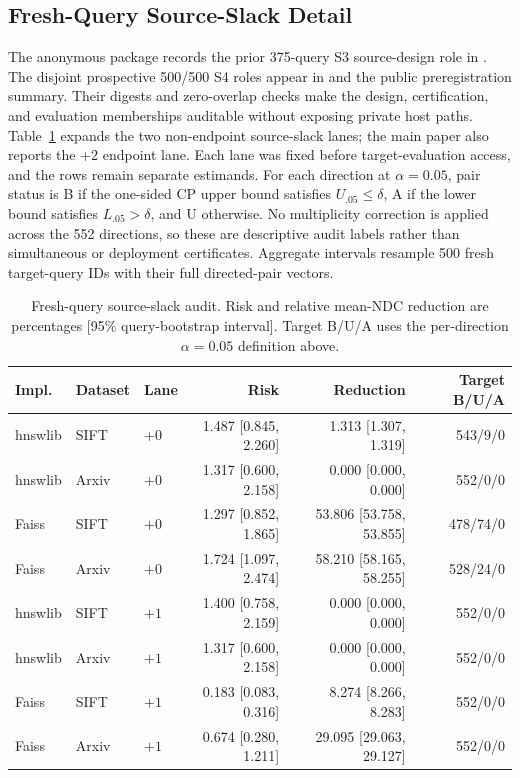 \documentclass[sigconf,anonymous]{acmart}
\begin{document}
\subsection{Fresh-Query Source-Slack Detail}
The anonymous package records the prior 375-query S3 source-design role in . The disjoint prospective 500/500 S4 roles appear in  and the public preregistration summary. Their digests and zero-overlap checks make the design, certification, and evaluation memberships auditable without exposing private host paths.
Table~\ref{tab:fresh-detail} expands the two non-endpoint source-slack lanes; the main paper also reports the $+2$ endpoint lane. Each lane was fixed before target-evaluation access, and the rows remain separate estimands. For each direction at $\alpha=0.05$, pair status is B if the one-sided CP upper bound satisfies $U_{.05}\leq\delta$, A if the lower bound satisfies $L_{.05}>\delta$, and U otherwise. No multiplicity correction is applied across the 552 directions, so these are descriptive audit labels rather than simultaneous or deployment certificates. Aggregate intervals resample 500 fresh target-query IDs with their full directed-pair vectors.

\begin{table}[t]
\caption{Fresh-query source-slack audit. Risk and relative mean-NDC reduction are percentages [95\% query-bootstrap interval]. Target B/U/A uses the per-direction $\alpha=0.05$ definition above.}
\label{tab:fresh-detail}
\small\begin{tabular*}{\textwidth}{@{\extracolsep{\fill}}lllrrr@{}}\toprule
Impl. & Dataset & Lane & Risk & Reduction & Target B/U/A\\\midrule
hnswlib & SIFT & $+0$ & 1.487 [0.845, 2.260] & 1.313 [1.307, 1.319] & 543/9/0\\
hnswlib & Arxiv & $+0$ & 1.317 [0.600, 2.158] & 0.000 [0.000, 0.000] & 552/0/0\\
Faiss & SIFT & $+0$ & 1.297 [0.852, 1.865] & 53.806 [53.758, 53.855] & 478/74/0\\
Faiss & Arxiv & $+0$ & 1.724 [1.097, 2.474] & 58.210 [58.165, 58.255] & 528/24/0\\
hnswlib & SIFT & $+1$ & 1.400 [0.758, 2.159] & 0.000 [0.000, 0.000] & 552/0/0\\
hnswlib & Arxiv & $+1$ & 1.317 [0.600, 2.158] & 0.000 [0.000, 0.000] & 552/0/0\\
Faiss & SIFT & $+1$ & 0.183 [0.083, 0.316] & 8.274 [8.266, 8.283] & 552/0/0\\
Faiss & Arxiv & $+1$ & 0.674 [0.280, 1.211] & 29.095 [29.063, 29.127] & 552/0/0\\\bottomrule
\end{tabular*}
\end{table}
\end{document}
